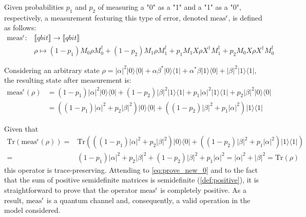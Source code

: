   Given probabilities $p_1$ and $p_2$ of measuring a "0" as a "1" and a "1" as a "0", respectively, a measurement featuring this type of error, denoted $\text{meas}^{\epsilon}$, is defined as follows:
  \begin{equation}
    \begin{split}
      \text{meas}^{\epsilon}: &\llbracket \textit{qbit} \rrbracket \rightarrow \llbracket \textit{qbit} \rrbracket \\
    & \rho \mapsto (1-p_1)M_0 \rho M_0^{\dag} + (1-p_2) M_1 \rho M_1^{\dag} + p_1  M_1X\rho  X^{\dag}  M_1^{\dag} + p_2 M_0 X\rho X^{\dag} M_0^{\dag}
    \end{split}
  \end{equation}

Considering an arbitrary state $ \rho=|\alpha|^{2} |0\rangle \langle 0 | + \alpha \beta^{*} |0\rangle \langle 1 | + \alpha^{*} \beta |1\rangle \langle 0 | + |\beta|^{2} |1\rangle \langle 1 |$, the resulting state after measurement is:
\begin{equation}
  \begin{split}
    \text{meas}^{\epsilon} (\rho) & =  (1-p_1) |\alpha|^{2} |0\rangle \langle 0 | + (1-p_2)  |\beta|^{2} |1\rangle \langle 1 | + p_1 |\alpha|^{2} |1\rangle \langle 1 | + p_2 |\beta|^{2}  |0\rangle \langle 0 | \\
  & = ((1-p_1)|\alpha|^{2} + p_2 |\beta|^{2}) |0\rangle \langle 0 | + ((1-p_2) |\beta|^{2} + p_1 |\alpha|^{2}) |1\rangle \langle 1 | 
\end{split}
\end{equation}

Given that 
\begin{equation}
  \begin{split}
    \text{Tr} (\text{meas}^{\epsilon} (\rho))= &\text{Tr}(((1-p_1)|\alpha|^{2} + p_2 |\beta|^{2}) |0\rangle \langle 0 | + ((1-p_2) |\beta|^{2} + p_1 |\alpha|^{2}) |1\rangle \langle 1 |) \\
  =& (1-p_1)|\alpha|^{2} + p_2 |\beta|^{2} + (1-p_2) |\beta|^{2} + p_1 |\alpha|^{2} =  |\alpha|^{2} + |\beta|^{2} = \text{Tr}(\rho)
\end{split}
\end{equation}
this operator is trace-preserving. Attending to \autoref{eq:prove_new_0} and to the fact that the sum of positive semidefinite matrices is semidefinite (\autoref{def:positive}), it is straightforward to prove that the operator $\text{meas}^{\epsilon}$ is completely positive. As a result, $\text{meas}^{\epsilon}$ is a quantum channel and, consequently, a valid operation in the model considered.
  

